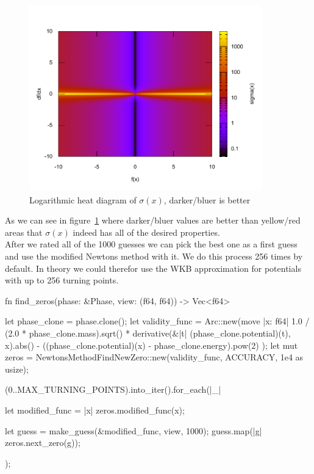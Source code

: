\documentclass[11pt,DIV=10,final]{scrreprt} %
\begin{document}
{\begin{figure}[H]
  \centering
  \includegraphics[width=0.9\textwidth]{plots/newton_rating_func.pdf}
  \caption{Logarithmic heat diagram of $\sigma(x)$, darker/bluer is better}\label{fig:simga-heat}
\end{figure}
As we can see in figure~\ref{fig:simga-heat} where darker/bluer values are better than yellow/red areas that $\sigma(x)$ indeed has all of the desired properties.
\\
After we rated all of the 1000 guesses we can pick the best one as a first guess and use the modified Newtons method with it. We do this process 256 times by default. In theory we could therefor use the WKB approximation for potentials with up to 256 turning points.

\begin{rustcode}
fn find_zeros(phase: &Phase, view: (f64, f64)) -> Vec<f64> {
    let phase_clone = phase.clone();
    let validity_func = Arc::new(move |x: f64| {
        1.0 / (2.0 * phase_clone.mass).sqrt() * derivative(&|t| (phase_clone.potential)(t), x).abs()
            - ((phase_clone.potential)(x) - phase_clone.energy).pow(2)
    });
    let mut zeros = NewtonsMethodFindNewZero::new(validity_func, ACCURACY, 1e4 as usize);

    (0..MAX_TURNING_POINTS).into_iter().for_each(|_| {
        let modified_func = |x| zeros.modified_func(x);

        let guess = make_guess(&modified_func, view, 1000);
        guess.map(|g| zeros.next_zero(g));
    });

}
\end{rustcode}}
\end{document}
